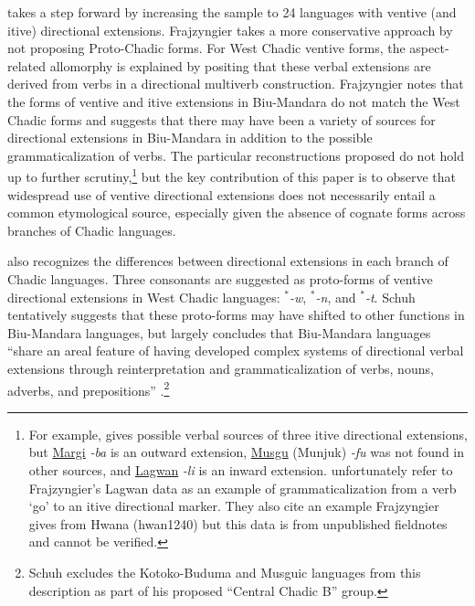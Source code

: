 
\citet{frajzyngierVentiveCentrifugalChadic1987} takes a step forward by increasing the sample to 24 languages with ventive (and itive) directional extensions. Frajzyngier takes a more conservative approach by not proposing Proto-Chadic forms. For West Chadic ventive forms, the aspect-related allomorphy is explained by positing that these verbal extensions are derived from verbs in a directional multiverb construction. Frajzyngier notes that the forms of ventive and itive extensions in Biu-Mandara do not match the West Chadic forms and suggests that there may have been a variety of sources for directional extensions in Biu-Mandara in addition to the possible grammaticalization of verbs. The particular reconstructions proposed do not hold up to further scrutiny,\footnote{For example, \citet[35]{frajzyngierVentiveCentrifugalChadic1987} gives possible verbal sources of three itive directional extensions, but \hyperref[marg]{Margi} \textit{-ba} is an outward extension, \hyperref[musg]{Musgu} (Munjuk) \textit{-fu} was not found in other sources, and \hyperref[lagw]{Lagwan} \textit{-li} is an inward extension. \citet{heineWorldLexiconGrammaticalization2002} unfortunately refer to Frajzyngier's Lagwan data as an example of grammaticalization from a verb `go' to an itive directional marker. They also cite an example Frajzyngier gives from Hwana (hwan1240) but this data is from unpublished fieldnotes and cannot be verified.} but the key contribution of this paper is to observe that widespread use of ventive directional extensions does not necessarily entail a common etymological source, especially given the absence of cognate forms across branches of Chadic languages. 

\citet[306--318]{schuhChadicCornucopia2017} also recognizes the differences between directional extensions in each branch of Chadic languages. Three consonants are suggested as proto-forms of ventive directional extensions in West Chadic languages:  $^\ast$\textit{-w}, $^\ast$\textit{-n}, and $^\ast$\textit{-t}. Schuh tentatively suggests that these proto-forms may have shifted to other functions in Biu-Mandara languages, but largely concludes that Biu-Mandara languages ``share an areal feature of having developed complex systems of directional verbal extensions through reinterpretation and grammaticalization of verbs, nouns, adverbs, and prepositions'' \citep[316]{schuhChadicCornucopia2017}.\footnote{Schuh excludes the Kotoko-Buduma and Musguic languages from this description as part of his proposed ``Central Chadic B'' group.} 

